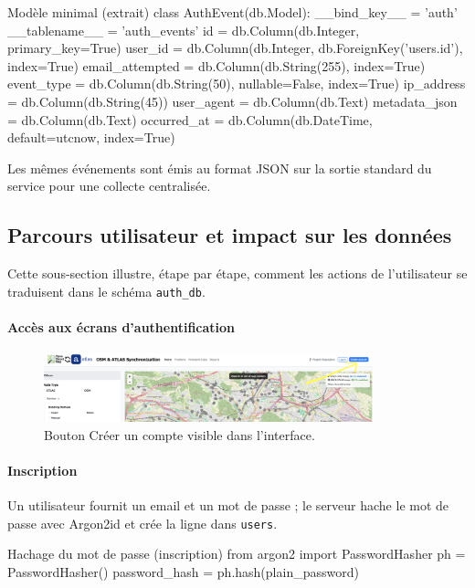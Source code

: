 \begin{codebox}[language=Python]{Modèle minimal (extrait)}
class AuthEvent(db.Model):
    __bind_key__ = 'auth'
    __tablename__ = 'auth_events'
    id = db.Column(db.Integer, primary_key=True)
    user_id = db.Column(db.Integer, db.ForeignKey('users.id'), index=True)
    email_attempted = db.Column(db.String(255), index=True)
    event_type = db.Column(db.String(50), nullable=False, index=True)
    ip_address = db.Column(db.String(45))
    user_agent = db.Column(db.Text)
    metadata_json = db.Column(db.Text)
    occurred_at = db.Column(db.DateTime, default=utcnow, index=True)
\end{codebox}

\noindent Les mêmes événements sont émis au format JSON sur la sortie standard du service pour une collecte centralisée.
\subsection{Parcours utilisateur et impact sur les données}
Cette sous-section illustre, étape par étape, comment les actions de l'utilisateur se traduisent dans le schéma \texttt{auth\_db}.

\paragraph{Accès aux écrans d'authentification}
\begin{figure}[H]
  \centering
  \includegraphics[width=0.85\textwidth]{../figures/chap10/auth1.png}
  \caption{Bouton \og Créer un compte \fg{} visible dans l'interface.}
\end{figure}

\paragraph{Inscription}
Un utilisateur fournit un email et un mot de passe ; le serveur hache le mot de passe avec Argon2id et crée la ligne dans \texttt{users}.

\begin{codebox}[language=Python]{Hachage du mot de passe (inscription)}
from argon2 import PasswordHasher
ph = PasswordHasher()
password_hash = ph.hash(plain_password)
\end{codebox}


